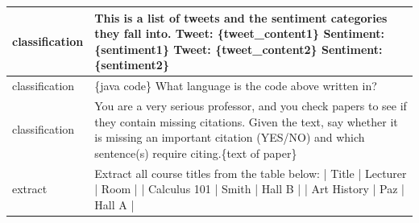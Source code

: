 \documentclass{article}
\begin{document}
\begin{longtable}{p{} p{}}
classification &                                                                                                                                                                                                                                      This is a list of tweets and the sentiment categories they fall into.{\newline} {\newline}{\newline} Tweet: \{tweet\_content1\}{\newline} Sentiment: \{sentiment1\}{\newline} {\newline}{\newline} Tweet: \{tweet\_content2\}{\newline} Sentiment: \{sentiment2\} \\ \midrule
classification &                                                                                                                                                                                                                                                                                                                                                               \{java code\}{\newline} {\newline}{\newline} What language is the code above written in? \\ \midrule
classification &                                                                                                                                                                                           You are a very serious professor, and you check papers to see if they contain missing citations. Given the text, say whether it is missing an important citation (YES/NO) and which sentence(s) require citing.{\newline}{\newline}\{text of paper\} \\ \midrule
       extract &                                                                                                                                                                                                                                                                      Extract all course titles from the table below:{\newline} {\newline}{\newline} | Title | Lecturer | Room |{\newline} | Calculus 101 | Smith | Hall B |{\newline} | Art History | Paz | Hall A | \\ \midrule

\end{longtable}
\end{document}
